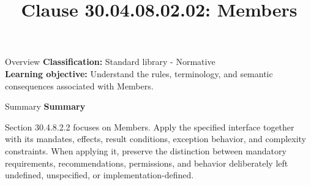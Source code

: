 \documentclass[10pt,letterpaper]{article}
\title{Clause 30.04.08.02.02: Members}
\author{}
\date{}
\begin{document}
\maketitle
\begin{CornellOverviewBox}{Overview}
\textbf{Classification:} Standard library - Normative\\[2pt]
\textbf{Learning objective:} Understand the rules, terminology, and semantic consequences associated with Members.
\end{CornellOverviewBox}\begin{CornellSummaryBox}{Summary}
{\sffamily\bfseries\color{Accent} Summary}\par\vspace{3pt}Section 30.4.8.2.2 focuses on Members. Apply the specified interface together with its mandates, effects, result conditions, exception behavior, and complexity constraints. When applying it, preserve the distinction between mandatory requirements, recommendations, permissions, and behavior deliberately left undefined, unspecified, or implementation-defined.
\end{CornellSummaryBox}
\end{document}
